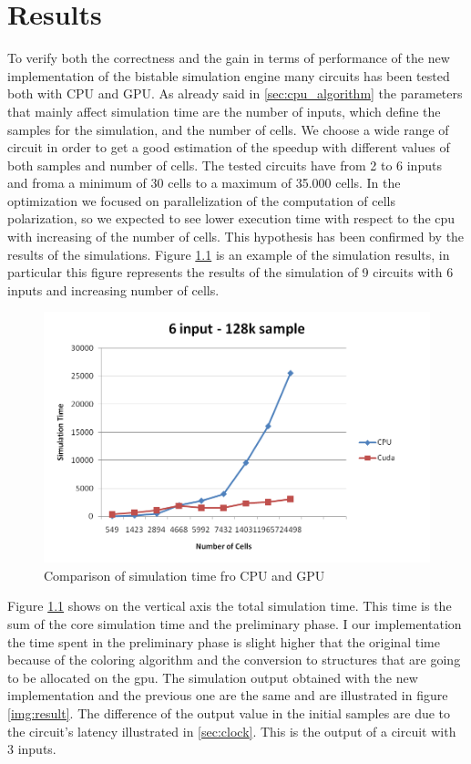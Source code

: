 \chapter{Results}\label{sec:results}
To verify both the correctness and the gain in terms of performance of the new implementation of the bistable simulation engine many circuits has been tested both with CPU and GPU. As already said in \ref{sec:cpu_algorithm} the parameters that mainly affect simulation time are the number of inputs, which define the samples for the simulation, and the number of cells. We choose a wide range of circuit in order to get a good estimation of the speedup with different values of both samples and number of cells. The tested circuits have from 2 to 6  inputs and froma a minimum of 30 cells to a maximum of 35.000 cells. \newline
In the optimization we focused on parallelization of the computation of cells polarization, so we expected to see lower execution time with respect to the cpu with increasing of the number of cells. This hypothesis has been confirmed by the results of the simulations. Figure \ref{img:graph5} is an example of the simulation results, in particular this figure represents the results of the simulation of 9 circuits with 6 inputs and increasing number of cells.

\begin{figure}
\centering
\includegraphics[scale=0.6]{img/graph5.png}
\caption{Comparison of simulation time fro CPU and GPU}
\label{img:graph5}
\end{figure}

Figure \ref{img:graph5} shows on the vertical axis the total simulation time. This time is the sum of the core simulation time and the preliminary phase. I our implementation the time spent in the preliminary phase is slight higher that the original time because of the coloring algorithm and the conversion to structures that are going to be allocated on the gpu.\newline
The simulation output obtained with the new implementation and the previous one are the same and are illustrated in figure \ref{img:result}. The difference of the output value in the initial samples are due to the circuit's latency illustrated in \ref{sec:clock}. This is the output of a circuit with 3 inputs.


